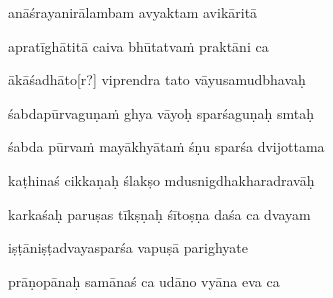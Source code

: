 anāśrayanirālambam avyaktam avikāritā\thinspace{\dandab} \dontdisplaylinenum

apratīghātitā caiva bhūtatva\.m praktāni ca \veg\dontdisplaylinenum


ākāśadhāto[r?] viprendra tato vāyusamudbhavaḥ\thinspace{\dandab} \dontdisplaylinenum

śabdapūrvaguṇa\.m ghya vāyoḥ sparśaguṇaḥ smtaḥ \veg\dontdisplaylinenum

śabda pūrva\.m mayākhyāta\.m śṇu sparśa dvijottama\thinspace{\dandab} \dontdisplaylinenum

kaṭhinaś cikkaṇaḥ ślakṣo mdusnigdhakharadravāḥ \veg\dontdisplaylinenum

karkaśaḥ paruṣas tīkṣṇaḥ śītoṣṇa daśa ca dvayam\thinspace{\dandab} \dontdisplaylinenum

iṣṭāniṣṭadvayasparśa vapuṣā parighyate \veg\dontdisplaylinenum



prāṇopānaḥ samānaś ca udāno vyāna eva ca\thinspace{\dandab} \dontdisplaylinenum

